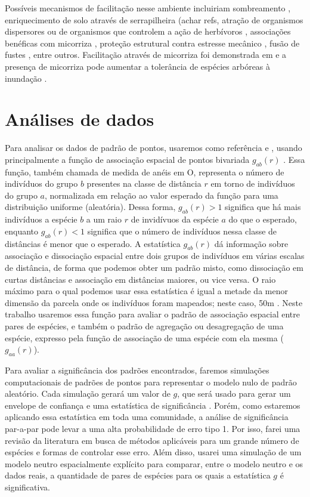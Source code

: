 \documentclass[twoside,12pt,a4paper]{report}
\begin{document}
Possíveis mecanismos de facilitação nesse ambiente incluiriam sombreamento
\citep{Castanho2014, etc}, enriquecimento de solo através de serrapilheira (achar refs, atração de
organismos dispersores \citep{achar refs CallawayBook} ou de organismos que controlem a ação de
herbívoros \citep{refs}, associações benéficas com micorriza \citep{Simard1997}, proteção
estrutural contra estresse mecânico \citep{refs}, fusão de fustes \citep{McIntire2011}, entre
outros. Facilitação através de micorriza foi demonstrada em \citep{Simard1997} e a presença de
micorriza pode aumentar a tolerância de espécies arbóreas à inundação \citep{Fougnies2007}. 

\section{Análises de dados}

Para analisar os dados de padrão de pontos, usaremos como referência \citep{IllianBook} e
\citep{WiegandBook}, usando principalmente a função de associação espacial de pontos bivariada
$g_{ab}(r)$ \citep{IllianBook,WiegandBook,Stoyan1994}. Essa função, também chamada de medida de
anéis em O, representa o número de indivíduos do grupo $b$ presentes na classe de distância $r$ em
torno de indivíduos do grupo $a$, normalizada em relação ao valor esperado da função para uma
distribuição uniforme (aleatória). Dessa forma, $g_{ab}(r) > 1$ significa que há mais indivíduos a
espécie $b$ a um raio $r$ de invidívuos da espécie $a$ do que o esperado,
enquanto $g_{ab}(r) < 1 $ significa que o número de indivíduos nessa classe de distâncias é menor
que o esperado. A estatística $g_{ab}(r)$ dá informação sobre associação e dissociação espacial
entre dois grupos de indivíduos em várias escalas de distância, de forma que podemos obter um padrão
misto, como dissociação em curtas distâncias e associação em distâncias maiores, ou vice versa. O
raio máximo para o qual podemos usar essa estatística é igual a metade da menor dimensão da parcela
onde os indivíduos foram mapeados; neste caso, 50m \citep{IllianBook}. Neste trabalho usaremos essa
função para avaliar o padrão de associação espacial entre pares de espécies, e também o padrão de
agregação ou desagregação de uma espécie, expresso pela função de associação de uma espécie com ela
mesma ($g_{aa}(r)$).

Para avaliar a significância dos padrões encontrados, faremos simulações computacionais de padrões
de pontos para representar o modelo nulo de padrão aleatório. Cada simulação gerará um valor de
$g$, que será usado para gerar um envelope de confiança e uma estatística de significância
\citep{IllianBook,DiggleBook}. Porém, como estaremos aplicando essa estatística em toda uma
comunidade, a análise de significância par-a-par pode levar a uma alta probabilidade de erro tipo 1.
Por isso, farei uma revisão da literatura em busca de métodos aplicáveis para um grande número de
espécies e formas de controlar esse erro. Além disso, usarei uma simulação de um modelo neutro
espacialmente explícito para comparar, entre o modelo neutro e os dados reais, a quantidade de pares de espécies para os quais a estatística
$g$ é significativa.
\end{document}
